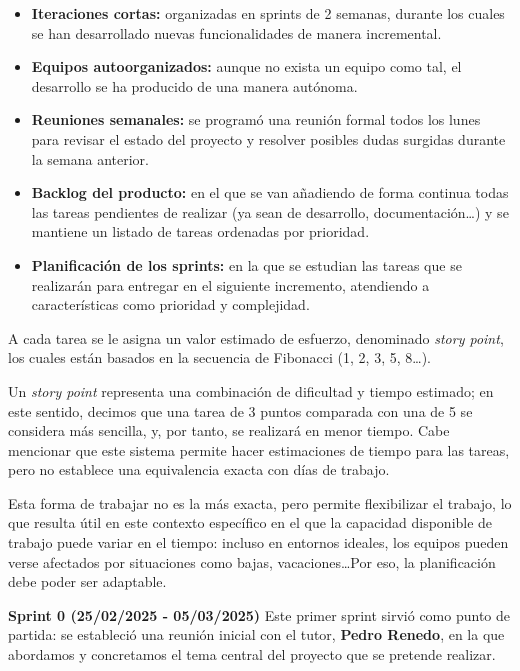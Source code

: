 \begin{itemize}
    \item \textbf{Iteraciones cortas:} organizadas en sprints de 2 semanas, durante los cuales se han desarrollado
    nuevas funcionalidades de manera incremental.
    \item \textbf{Equipos autoorganizados:} aunque no exista un equipo como tal, el desarrollo se ha producido de una manera autónoma.
    \item \textbf{Reuniones semanales:} se programó una reunión formal todos los lunes para revisar el estado del proyecto y
    resolver posibles dudas surgidas durante la semana anterior.
    \item \textbf{Backlog del producto:} en el que se van añadiendo de forma continua todas las tareas pendientes de realizar (ya sean de
    desarrollo, documentación\ldots) y se mantiene un listado de tareas ordenadas por prioridad.
    \item \textbf{Planificación de los sprints:} en la que se estudian las tareas que se realizarán para entregar en el
    siguiente incremento, atendiendo a características como prioridad y complejidad.
\end{itemize}

A cada tarea se le asigna un valor estimado de esfuerzo, denominado \textit{story point}, los cuales están basados en la secuencia de
Fibonacci (1, 2, 3, 5, 8\ldots).

Un \textit{story point} representa una combinación de dificultad y tiempo estimado; en este sentido, decimos que una
tarea de 3 puntos comparada con una de 5 se considera más sencilla, y, por tanto, se realizará en menor tiempo.
Cabe mencionar que este sistema permite hacer estimaciones de tiempo para las tareas, pero no establece una equivalencia exacta con días de trabajo.

Esta forma de trabajar no es la más exacta, pero permite flexibilizar el trabajo, lo que resulta útil en este contexto
específico en el que la capacidad disponible de trabajo puede variar en el tiempo: incluso en entornos ideales, los
equipos pueden verse afectados por situaciones como bajas, vacaciones\ldots Por eso, la planificación debe poder ser adaptable.

\textbf{Sprint 0 (25/02/2025 - 05/03/2025)}
Este primer sprint sirvió como punto de partida: se estableció una reunión inicial con el tutor, \textbf{Pedro Renedo}, en la que
abordamos y concretamos el tema central del proyecto que se pretende realizar.

